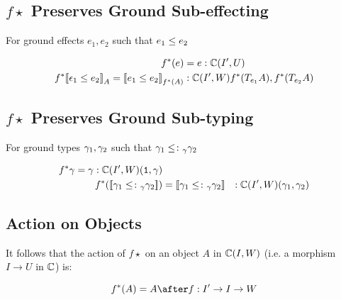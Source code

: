 {\subsection{$f\star$ Preserves Ground Sub-effecting}
For ground effects $e_1, e_2$ such that $e_1\leq e_2$



\begin{align}
    f^*(e) & = e: \mathbb{C}(I', U)\\
    f^*{\bf [\![}\epsilon_1\leq e_2{\bf ]\!]}_A = {\bf [\![}e_1 \leq e_2{\bf ]\!]}_{f^*(A)} &:\mathbb{C}(I', W){f^*(T_{e_1}{A}), f^*(T_{e_2}{A})} \\
\end{align}
\subsection{$f\star$ Preserves Ground Sub-typing}
For ground types $\gamma_1, \gamma_2$ such that $\gamma_1\leq\colon_\gamma\gamma_2$

\begin{align}
    f^*{\gamma} = \gamma: \mathbb{C}(I', W)(\texttt{1}, \gamma)\\
    f^*({\bf [\![}\gamma_1 \leq\colon_\gamma \gamma_2{\bf ]\!]}) & = {\bf [\![}\gamma_1 \leq\colon_\gamma \gamma_2{\bf ]\!]} &: \mathbb{C}(I', W)(\gamma_1, \gamma_2)\\
\end{align}

\subsection{Action on Objects}

It follows that the action of $f\star$ on an object $A$ in $\mathbb{C}(I, W)$ (i.e. a morphism $I \rightarrow U$ in $\mathbb{C}$) is:

\begin{equation}
    f\star(A) = A\after f: I'\rightarrow I\rightarrow W
\end{equation}

}

\newcommand\allICrole[0]{
    
We expand $\allI: \ciuw \rightarrow \ciw$ to be a functor which is right adjoint to the re-indexing functor $\pstar$.

\begin{equation}
    \bar{(\_)}: \ciuw(\pstar A, B) \leftrightarrow \ciw(A, \allI B) : \widehat{(\_)}
\end{equation}

For $A: \ciw$, $B: \ciuw$.

Hence the action of $\allI$ on a morphism $l : A\rightarrow A'$ is as follows:
\begin{eqnarray}
    \allI(l) = \bar{l\after\e_A}
\end{eqnarray}
Where $\e_A: \ciuw(\pstar\allI A \rightarrow A)$ is the co-unit of the adjunction.

}


